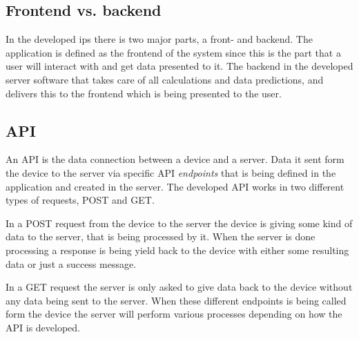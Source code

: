 \subsection{Frontend vs. backend}\label{sec:implArchitectureFrontBack}
In the developed \acrshort{ips} there is two major parts, a front- and backend.
The application is defined as the frontend of the system since this is the part that a user will interact with and get data presented to it. 
The backend in the developed server software that takes care of all calculations and data predictions, and delivers this to the frontend which is being presented to the user.


\subsection{API}\label{sec:implArchitectureApi}
An API is the data connection between a device and a server.
Data it sent form the device to the server via specific API \textit{endpoints} that is being defined in the application and created in the server.
The developed API works in two different types of requests, POST and GET.

\bigskip

In a POST request from the device to the server the device is giving some kind of data to the server, that is being processed by it.
When the server is done processing a response is being yield back to the device with either some resulting data or just a success message.

\bigskip

In a GET request the server is only asked to give data back to the device without any data being sent to the server.
When these different endpoints is being called form the device the server will perform various processes depending on how the API is developed.

